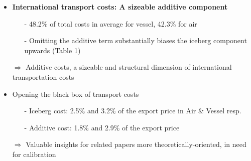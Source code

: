 \documentclass[10 pt,Helvetica, french]{beamer}
\begin{document}
\begin{frame}[label = slide_result1]
\begin{itemize}
\item \textbf{International transport costs: A sizeable additive component}  \vspace{0.2cm}
\begin{itemize}
\item[-] 48.2\% of total costs in average for vessel, 42.3\% for air  \vspace{0.1cm}
\item[-] Omitting the additive term substantially biases the iceberg component upwards (Table 1) \vspace{0.2cm}
\end{itemize}
\pause
\item[$\Rightarrow$] Additive costs, a sizeable and structural dimension of international transportation costs \vspace{0.1cm}
\item Opening the black box of transport costs \hyperlink{app_comparison}{} \vspace{0.1cm}
\begin{itemize}
\item[-] Iceberg cost: 2.5\% and 3.2\% of the export price in Air \& Vessel resp.
\item[-] Additive cost: 1.8\% and 2.9\% of the export price \vspace{0.1cm}
\end{itemize}
\pause
\item[$\Rightarrow$] Valuable insights for related papers more theoretically-oriented, in need for calibration

\end{itemize}
\end{frame}

\end{document}
